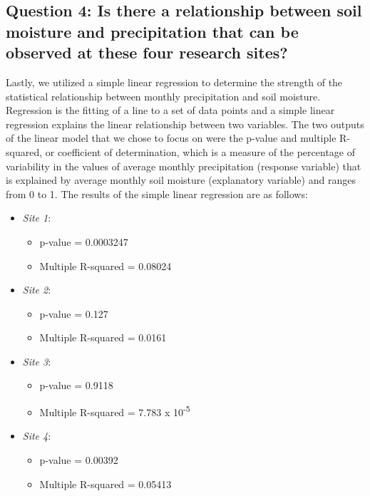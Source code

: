 \documentclass[
  12pt,
]{article}
\providecommand{\tightlist}{%
  \setlength{\itemsep}{0pt}\setlength{\parskip}{0pt}}
\begin{document}
\hypertarget{question-4-is-there-a-relationship-between-soil-moisture-and-precipitation-that-can-be-observed-at-these-four-research-sites}{%
\subsection{Question 4: Is there a relationship between soil moisture
and precipitation that can be observed at these four research
sites?}\label{question-4-is-there-a-relationship-between-soil-moisture-and-precipitation-that-can-be-observed-at-these-four-research-sites}}

Lastly, we utilized a simple linear regression to determine the strength
of the statistical relationship between monthly precipitation and soil
moisture. Regression is the fitting of a line to a set of data points
and a simple linear regression explains the linear relationship between
two variables. The two outputs of the linear model that we chose to
focus on were the p-value and multiple R-squared, or coefficient of
determination, which is a measure of the percentage of variability in
the values of average monthly precipitation (response variable) that is
explained by average monthly soil moisture (explanatory variable) and
ranges from 0 to 1. The results of the simple linear regression are as
follows:

\begin{itemize}
\tightlist
\item
  \emph{Site 1}:

  \begin{itemize}
  \tightlist
  \item
    p-value = 0.0003247
  \item
    Multiple R-squared = 0.08024
  \end{itemize}
\item
  \emph{Site 2}:

  \begin{itemize}
  \tightlist
  \item
    p-value = 0.127
  \item
    Multiple R-squared = 0.0161
  \end{itemize}
\item
  \emph{Site 3}:

  \begin{itemize}
  \tightlist
  \item
    p-value = 0.9118
  \item
    Multiple R-squared = 7.783 x 10\textsuperscript{-5}
  \end{itemize}
\item
  \emph{Site 4}:

  \begin{itemize}
  \tightlist
  \item
    p-value = 0.00392
  \item
    Multiple R-squared = 0.05413
  \end{itemize}
\end{itemize}
\end{document}
